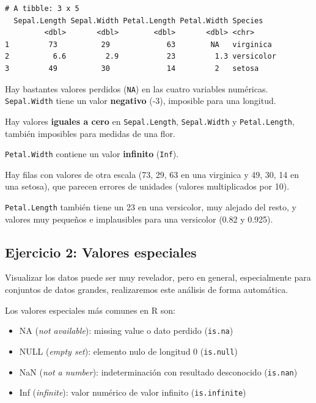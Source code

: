 \documentclass[
]{article}
\providecommand{\tightlist}{%
  \setlength{\itemsep}{0pt}\setlength{\parskip}{0pt}}
\begin{document}
\begin{verbatim}
# A tibble: 3 x 5
  Sepal.Length Sepal.Width Petal.Length Petal.Width Species   
         <dbl>       <dbl>        <dbl>       <dbl> <chr>     
1         73          29             63        NA   virginica 
2          6.6         2.9           23         1.3 versicolor
3         49          30             14         2   setosa    
\end{verbatim}

Hay bastantes valores perdidos (\texttt{NA}) en las cuatro variables
numéricas. \texttt{Sepal.Width} tiene un valor \textbf{negativo} (-3),
imposible para una longitud.

Hay valores \textbf{iguales a cero} en \texttt{Sepal.Length},
\texttt{Sepal.Width} y \texttt{Petal.Length}, también imposibles para
medidas de una flor.

\texttt{Petal.Width} contiene un valor \textbf{infinito} (\texttt{Inf}).

Hay filas con valores de otra escala (73, 29, 63 en una virginica y 49,
30, 14 en una setosa), que parecen errores de unidades (valores
multiplicados por 10).

\texttt{Petal.Length} también tiene un 23 en una versicolor, muy alejado
del resto, y valores muy pequeños e implausibles para una versicolor
(0.82 y 0.925).

\subsection{Ejercicio 2: Valores
especiales}\label{ejercicio-2-valores-especiales}

Visualizar los datos puede ser muy revelador, pero en general,
especialmente para conjuntos de datos grandes, realizaremos este
análisis de forma automática.

Los valores especiales más comunes en R son:

\begin{itemize}
\tightlist
\item
  NA (\emph{not available}): missing value o dato perdido
  (\texttt{is.na})
\item
  NULL (\emph{empty set}): elemento nulo de longitud 0
  (\texttt{is.null})
\item
  NaN (\emph{not a number}): indeterminación con resultado desconocido
  (\texttt{is.nan})
\item
  Inf (\emph{infinite}): valor numérico de valor infinito
  (\texttt{is.infinite})
\end{itemize}
\end{document}
